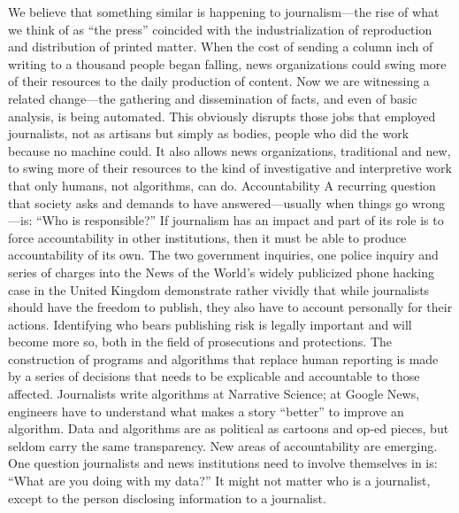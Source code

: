 We believe that something similar is happening to journalism—the rise of what
we think of as ``the press'' coincided with the industrialization of reproduction
and distribution of printed matter. When the cost of sending a column inch of
writing to a thousand people began falling, news organizations could swing more
of their resources to the daily production of content. Now we are witnessing a
related change—the gathering and dissemination of facts, and even of basic analysis,
is being automated. This obviously disrupts those jobs that employed journalists,
not as artisans but simply as bodies, people who did the work because no
machine could. It also allows news organizations, traditional and new, to swing
more of their resources to the kind of investigative and interpretive work that
only humans, not algorithms, can do.
Accountability
A recurring question that society asks and demands to have answered—usually
when things go wrong—is: ``Who is responsible?'' If journalism has an impact
and part of its role is to force accountability in other institutions, then it must
be able to produce accountability of its own. The two government inquiries,
one police inquiry and series of charges into the News of the World’s widely
publicized phone hacking case in the United Kingdom demonstrate rather vividly
that while journalists should have the freedom to publish, they also have to
account personally for their actions.
Identifying who bears publishing risk is legally important and will become more
so, both in the field of prosecutions and protections.
The construction of programs and algorithms that replace human reporting is
made by a series of decisions that needs to be explicable and accountable to those
affected. Journalists write algorithms at Narrative Science; at Google News, engineers
have to understand what makes a story ``better'' to improve an algorithm.
Data and algorithms are as political as cartoons and op-ed pieces, but seldom
carry the same transparency.
New areas of accountability are emerging. One question journalists and news
institutions need to involve themselves in is: ``What are you doing with my data?''
It might not matter who is a journalist, except to the person disclosing information
to a journalist.


